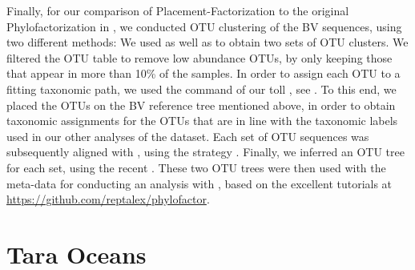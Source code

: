 Finally, for our comparison of Placement-Factorization to the original Phylofactorization \cite{Washburne2017a}
in ,
we conducted OTU clustering of the \ac{BV} sequences, using two different methods:
We used  \cite{Rognes2016} as well as  \cite{Mahe2014,Mahe2015}
to obtain two sets of OTU clusters.
We filtered the OTU table to remove low abundance OTUs, by only keeping those that appear in more than 10\% of the samples.
In order to assign each OTU to a fitting taxonomic path,
we used the  command of our toll  \cite{Czech2019-genesis-gappa},
see .
To this end, we placed the OTUs on the BV reference tree mentioned above,
in order to obtain taxonomic assignments for the OTUs
that are in line with the taxonomic labels used in our other analyses of the dataset.
Each set of OTU sequences was subsequently aligned with  \cite{Katoh2002,Katoh2013},
using the  strategy \cite{Katoh2005}.
Finally, we inferred an OTU tree for each set, using the recent  \cite{Kozlov2019a}.
These two OTU trees were then used with the meta-data for conducting an analysis with  \cite{Washburne2017a},
based on the excellent tutorials at \url{https://github.com/reptalex/phylofactor}.


%


\section{Tara Oceans}
\label{supp:sec:DetailsEmpiricalDatasets:sub:Tara}

